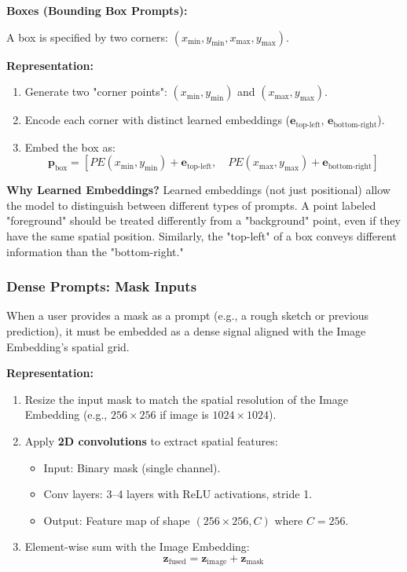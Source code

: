 \textbf{Boxes (Bounding Box Prompts):}

A box is specified by two corners: $(x_{\min}, y_{\min}, x_{\max}, y_{\max})$.

\textbf{Representation:}
\begin{enumerate}
    \item Generate two "corner points": $(x_{\min}, y_{\min})$ and $(x_{\max}, y_{\max})$.
    \item Encode each corner with distinct learned embeddings ($\mathbf{e}_{\text{top-left}}$, $\mathbf{e}_{\text{bottom-right}}$).
    \item Embed the box as:
       \[ \mathbf{p}_{\text{box}} = [PE(x_{\min}, y_{\min}) + \mathbf{e}_{\text{top-left}}, \quad PE(x_{\max}, y_{\max}) + \mathbf{e}_{\text{bottom-right}}] \]
\end{enumerate}

\textbf{Why Learned Embeddings?}
Learned embeddings (not just positional) allow the model to distinguish between different types of prompts. A point labeled "foreground" should be treated differently from a "background" point, even if they have the same spatial position. Similarly, the "top-left" of a box conveys different information than the "bottom-right."

\subsubsection{Dense Prompts: Mask Inputs}

When a user provides a mask as a prompt (e.g., a rough sketch or previous prediction), it must be embedded as a dense signal aligned with the Image Embedding's spatial grid.

\textbf{Representation:}
\begin{enumerate}
    \item Resize the input mask to match the spatial resolution of the Image Embedding (e.g., $256 \times 256$ if image is $1024 \times 1024$).
    \item Apply \textbf{2D convolutions} to extract spatial features:
    \begin{itemize}
        \item Input: Binary mask (single channel).
        \item Conv layers: 3–4 layers with ReLU activations, stride 1.
        \item Output: Feature map of shape $(256 \times 256, C)$ where $C = 256$.
    \end{itemize}
    \item Element-wise sum with the Image Embedding:
       \[ \mathbf{z}_{\text{fused}} = \mathbf{z}_{\text{image}} + \mathbf{z}_{\text{mask}} \]
\end{enumerate}

